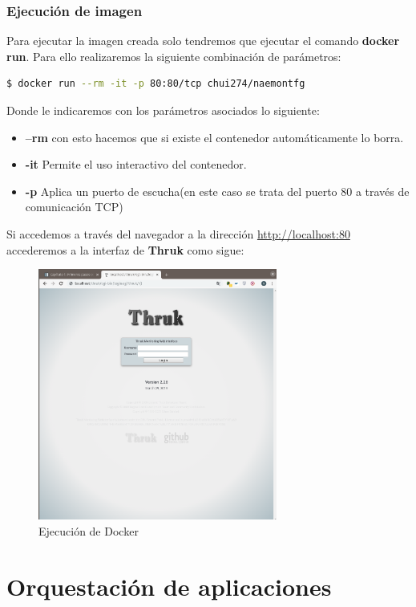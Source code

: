 \subsubsection{Ejecución de imagen}
Para ejecutar la imagen creada solo tendremos que ejecutar el comando \textbf{docker run}. 
Para ello realizaremos la siguiente combinación de parámetros:
\begin{lstlisting}[language=bash]
$ docker run --rm -it -p 80:80/tcp chui274/naemontfg
\end{lstlisting}
Donde le indicaremos con los parámetros asociados lo siguiente:
\begin{itemize}
	\item \textbf{--rm} con esto hacemos que si existe el contenedor automáticamente lo borra.
	\item \textbf{-it} Permite el uso interactivo del contenedor.
	\item \textbf{-p} Aplica un puerto de escucha(en este caso se trata del puerto 80 a través de comunicación TCP)
\end{itemize}
\newpage
Si accedemos a través del navegador a la dirección \url{http://localhost:80} accederemos a la interfaz de \textbf{Thruk} como sigue:
\begin{figure}[H]
	\centering
	\includegraphics[width=0.7\textwidth]{imagenes/despliegue_naemon/ejecucionDocker.png}
	\caption{Ejecución de Docker} \label{run}
\end{figure}

\section{Orquestación de aplicaciones}


